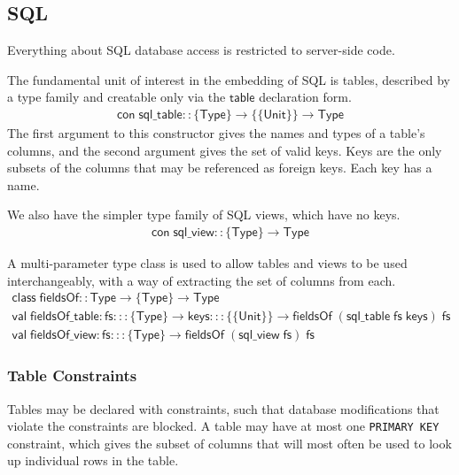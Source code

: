 \documentclass{article}
\newcommand{\mt}[1]{\mathsf{#1}}
\begin{document}
\subsection{SQL}

Everything about SQL database access is restricted to server-side code.

The fundamental unit of interest in the embedding of SQL is tables, described by a type family and creatable only via the $\mt{table}$ declaration form.
$$\begin{array}{l}
  \mt{con} \; \mt{sql\_table} :: \{\mt{Type}\} \to \{\{\mt{Unit}\}\} \to \mt{Type}
\end{array}$$
The first argument to this constructor gives the names and types of a table's columns, and the second argument gives the set of valid keys.  Keys are the only subsets of the columns that may be referenced as foreign keys.  Each key has a name.

We also have the simpler type family of SQL views, which have no keys.
$$\begin{array}{l}
  \mt{con} \; \mt{sql\_view} :: \{\mt{Type}\} \to \mt{Type}
\end{array}$$

A multi-parameter type class is used to allow tables and views to be used interchangeably, with a way of extracting the set of columns from each.
$$\begin{array}{l}
  \mt{class} \; \mt{fieldsOf} :: \mt{Type} \to \{\mt{Type}\} \to \mt{Type} \\
  \mt{val} \; \mt{fieldsOf\_table} : \mt{fs} ::: \{\mt{Type}\} \to \mt{keys} ::: \{\{\mt{Unit}\}\} \to \mt{fieldsOf} \; (\mt{sql\_table} \; \mt{fs} \; \mt{keys}) \; \mt{fs} \\
  \mt{val} \; \mt{fieldsOf\_view} : \mt{fs} ::: \{\mt{Type}\} \to \mt{fieldsOf} \; (\mt{sql\_view} \; \mt{fs}) \; \mt{fs}
\end{array}$$

\subsubsection{Table Constraints}

Tables may be declared with constraints, such that database modifications that violate the constraints are blocked.  A table may have at most one \texttt{PRIMARY KEY} constraint, which gives the subset of columns that will most often be used to look up individual rows in the table.
\end{document}
